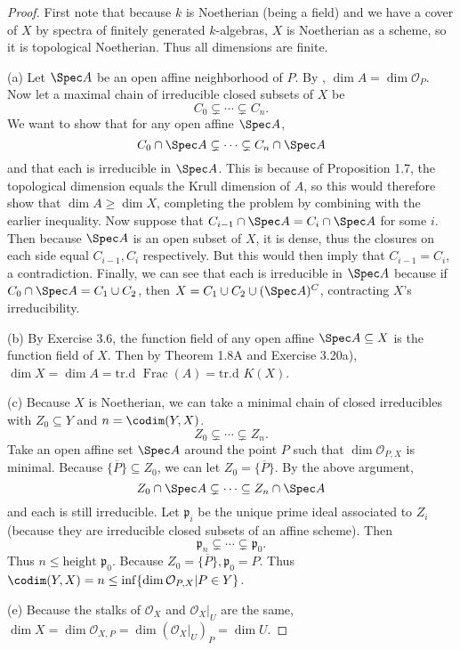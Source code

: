 \begin{proof}
	First note that because $k $ is Noetherian (being a field) and we have a cover of $X $ by spectra of finitely generated $k $-algebras, $X $ is Noetherian as a scheme, so it is topological Noetherian.
	Thus all dimensions are finite.

	(a) 
	Let $\Spec A $ be an open affine neighborhood of $P$.
	By , $\dim A = \dim \mathcal{O}_P $.
	Now let a maximal chain of irreducible closed subsets of $X $ be
	\[
		C_{0} \subsetneq \cdots \subsetneq C_n
	.\] 
	We want to show that for any open affine $\Spec A $,
	\[
		C_{0} \cap \Spec A \subsetneq \cdots \subsetneq C_n \cap \Spec A
	\] 
	and that each is irreducible in $\Spec A $.
	This is because of Proposition 1.7, the topological dimension equals the Krull dimension of $A $, so this would therefore show that $\dim A \ge \dim X $, completing the problem by combining with the earlier inequality.
	Now suppose that $C_{i-1} \cap \Spec A = C_{i}\cap \Spec A $ for some $i $.
	Then because $\Spec A $ is an open subset of $X $, it is dense, thus the closures on each side equal $C_{i-1}, C_i $ respectively.
	But this would then imply that $C_{i-1} = C_i $, a contradiction.
	Finally, we can see that each is irreducible in $\Spec A $ because if $C_{0} \cap \Spec A = C_{1}\cup C_{2}$, then $X = C_{1}\cup C_{2} \cup (\Spec A)^C $, contracting $X $'s irreducibility.

	(b) By Exercise 3.6, the function field of any open affine $\Spec A \subseteq X $ is the function field of $X $.
	Then by Theorem 1.8A and Exercise 3.20a), $\dim X = \dim A = \text{tr.d } \operatorname{Frac}(A) = \text{tr.d } K(X)$.

	(c) Because $X $ is Noetherian, we can take a minimal chain of closed irreducibles with $Z_{0} \subseteq Y $ and $n = \codim(Y,X) $.
	\[
		Z_{0} \subsetneq \cdots \subsetneq Z_n
	.\] 
	Take an open affine set $\Spec A $ around the point $P $ such that $\dim \mathcal{O}_{P,X} $ is minimal.
	Because $\overline{\{P\}  } \subseteq Z_{0}  $, we can let $Z_{0} = \overline{\{P\}  }  $.
	By the above argument,
	\[
		Z_{0}\cap \Spec A \subsetneq \cdots \subseteq Z_n \cap \Spec A
	\] 
	and each is still irreducible.
	Let $\mathfrak{p}_i $ be the unique prime ideal associated to $Z_i $ (because they are irreducible closed subsets of an affine scheme).
	Then
	\[
		\mathfrak{p}_n \subsetneq \cdots \subsetneq \mathfrak{p}_0
	.\] 
	Thus $n \le \text{height }\mathfrak{p}_0$.
	Because $Z_{0} = \overline{\{P\}  }, \mathfrak{p}_0 = P  $.
	Thus $\codim(Y,X) = n \le \inf \{\dim \mathcal{O}_{P,X}| P\in Y\}   $.

	(e) Because the stalks of $\mathscr{O}_X $ and $\mathscr{O}_X\big|_{U} $ are the same, $\dim X = \dim \mathcal{O}_{X,P} = \dim (\mathcal{O}_{X}\big|_{U})_P = \dim U$.
\end{proof}

